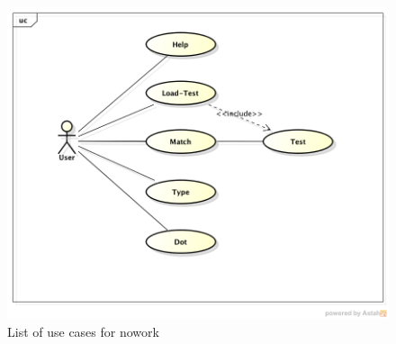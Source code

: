 \documentclass[12pt,a4paper]{article}
\begin{document}
\begin{figure}[h!]
  \centering
  \includegraphics[width=\linewidth,natwidth=\linewidth,natheight=\textheight]{use-case-diagram.png}
  \caption{List of use cases for nowork}
  \label{use-cases}
\end{figure}
\end{document}
